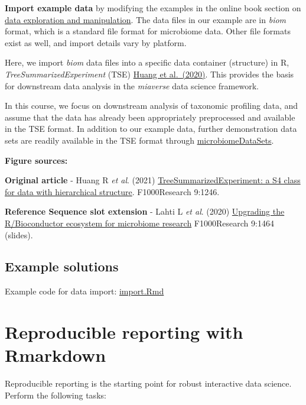 \documentclass[
  oneside]{book}
\begin{document}
\textbf{Import example data} by modifying the examples in the online book
section on \href{https://microbiome.github.io/OMA/data-introduction.html\#loading-experimental-microbiome-data}{data exploration and
manipulation}. The
data files in our example are in \emph{biom} format, which is a standard
file format for microbiome data. Other file formats exist as well, and
import details vary by platform.

Here, we import \emph{biom} data files into a specific data container (structure)
in R, \emph{TreeSummarizedExperiment} (TSE) \href{https://f1000research.com/articles/9-1246}{Huang et
al.~(2020)}. This provides
the basis for downstream data analysis in the \emph{miaverse} data science
framework.

In this course, we focus on downstream analysis of taxonomic profiling
data, and assume that the data has already been appropriately
preprocessed and available in the TSE format. In addition to our
example data, further demonstration data sets are readily available in
the TSE format through
\href{https://bioconductor.org/packages/release/data/experiment/html/microbiomeDataSets.html}{microbiomeDataSets}.

\textbf{Figure sources:}

\textbf{Original article}
- Huang R \emph{et al}. (2021) \href{https://doi.org/10.12688/\%20f1000research.26669.2}{TreeSummarizedExperiment: a S4 class
for data with hierarchical structure}. F1000Research 9:1246.

\textbf{Reference Sequence slot extension}
- Lahti L \emph{et al}. (2020) \href{https://doi.org/10.7490/\%20f1000research.1118447.1}{Upgrading the R/Bioconductor ecosystem for microbiome
research} F1000Research 9:1464 (slides).

\hypertarget{example-solutions}{%
\section{Example solutions}\label{example-solutions}}

Example code for data import: \url{import.Rmd}

\hypertarget{reproducible-reporting-with-rmarkdown}{%
\chapter{Reproducible reporting with Rmarkdown}\label{reproducible-reporting-with-rmarkdown}}

Reproducible reporting is the starting point for robust interactive
data science. Perform the following tasks:
\end{document}

